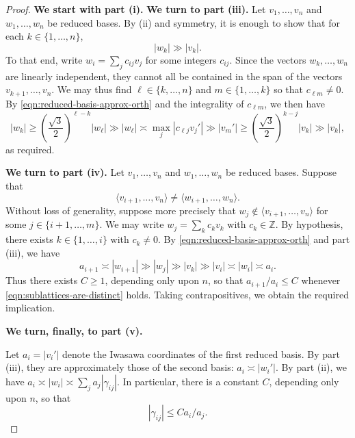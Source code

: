 \documentclass[reqno]{amsart} 
\begin{document}
\begin{proof} {\bf We start with part (i).}
  {\bf We turn to part (iii).}  Let $v_1,\dotsc,v_n$ and $w_1,\dotsc,w_n$ be reduced bases.  By (ii) and symmetry, it is enough to show that for each $k \in \{1, \dotsc, n\}$,
  \begin{equation*}
    |w_k| \gg |v_k|.
  \end{equation*}
  To that end, write $w_i = \sum_j c_{ij} v_j$ for some integers $c_{i j}$.  Since the vectors $w_k,\dotsc,w_n$ are linearly independent, they cannot all be contained in the span of the vectors $v_{k+1},\dotsc,v_n$.  We may thus find $\ell \in \{k,\dotsc,n\}$ and $m \in \{1,\dotsc,k\}$ so that $c_{\ell m} \neq 0$.  By \eqref{eqn:reduced-basis-approx-orth} and the integrality of $c_{\ell m}$, we then have
  \begin{equation*}
    |w_k| \geq \left( \frac{\sqrt{3}}{2} \right)^{\ell-k} |w_{\ell}| \gg |w_{\ell}| \asymp \max_j |c_{\ell j} v_j'| \gg |v_m'| \geq \left( \frac{\sqrt{3}}{2} \right)^{k-j} |v_k| \gg |v_k|,
  \end{equation*}
  as required.

  {\bf We turn to part (iv).}  Let $v_1,\dotsc,v_n$ and $w_1,\dotsc,w_n$ be reduced bases.  Suppose that
  \begin{equation}\label{eqn:sublattices-are-distinct}
    \langle v_{i+1},\dotsc,v_n \rangle \neq \langle
    w_{i+1},\dotsc, w_n \rangle.
  \end{equation}
  Without loss of generality, suppose more precisely that $w_j \notin \langle v_{i+1},\dotsc,v_n \rangle$ for some $j \in \{i+1,\dotsc,m\}$.  We may write $w_j = \sum_k c_k v_k$ with $c_k \in \mathbb{Z}$.  By hypothesis, there exists $k \in \{1, \dotsc, i\}$ with $c_k \neq 0$.  By \eqref{eqn:reduced-basis-approx-orth} and part (iii), we have
  \begin{equation*}
    a_{i+1} \asymp |w_{i+1}| \gg |w_j| \gg |v_k| \gg |v_i| \asymp |w_i| \asymp a_i.
  \end{equation*}
  Thus there exists $C \geq 1$, depending only upon $n$, so that $a_{i+1}/a_i \leq C$ whenever \eqref{eqn:sublattices-are-distinct} holds.  Taking contrapositives, we obtain the required implication.

  {\bf We turn, finally, to part (v).}
  
  Let $a_i = |v_i'|$ denote the Iwasawa coordinates of the first reduced basis.  By part (iii), they are approximately those of the second basis: $a_i \asymp |w_i'|$.  By part (ii), we have $a_i \asymp |w_i| \asymp \sum_j a_j |\gamma_{i j}|$.  In particular, there is a constant $C$, depending only upon $n$, so that
  \begin{equation}\label{eqn:gamma-ij-C-ai-aj}
    |\gamma_{i j}| \leq C a_i / a_j.
  \end{equation}


\end{proof}
\end{document}
